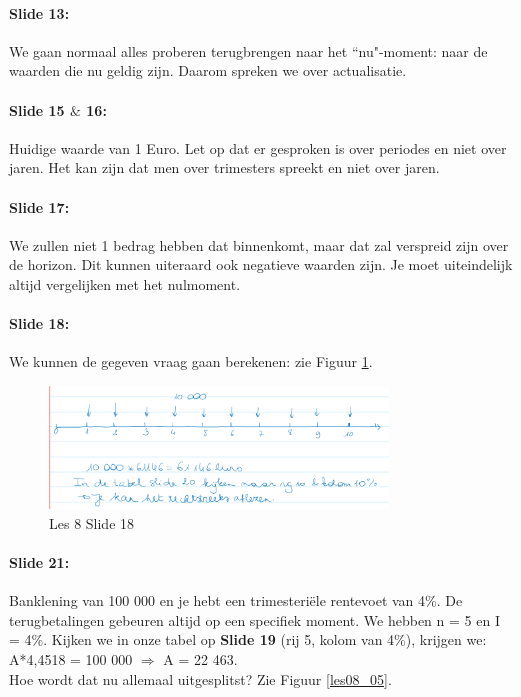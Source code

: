 \documentclass[10pt,a4paper]{report}
\begin{document}
\paragraph{Slide 13:} We gaan normaal alles proberen terugbrengen naar het ``nu"-moment: naar de waarden die nu geldig zijn. Daarom spreken we over actualisatie. 

\paragraph{Slide 15 $\&$ 16:} Huidige waarde van 1 Euro. Let op dat er gesproken is over periodes en niet over jaren. Het kan zijn dat men over trimesters spreekt en niet over jaren.

\paragraph{Slide 17:} We zullen niet 1 bedrag hebben dat binnenkomt, maar dat zal verspreid zijn over de horizon. Dit kunnen uiteraard ook negatieve waarden zijn. Je moet uiteindelijk altijd vergelijken met het nulmoment.

\paragraph{Slide 18:} We kunnen de gegeven vraag gaan berekenen: zie Figuur \ref{les08_04}.

\begin{figure}[h!]
\centering
\includegraphics[width=90mm]{Les08_04.png}
\caption{Les 8 Slide 18} 
\label{les08_04}
\end{figure}

\paragraph{Slide 21:} Banklening van 100 000 en je hebt een trimesteri\"ele rentevoet van 4\%. De terugbetalingen gebeuren altijd op een specifiek moment. We hebben n = 5 en I = 4\%. Kijken we in onze tabel op \textbf{Slide 19} (rij 5, kolom van 4\%), krijgen we: A*4,4518 = 100 000 $\Rightarrow$ A = 22 463.\\
Hoe wordt dat nu allemaal uitgesplitst? Zie Figuur \ref{les08_05}.
\end{document}
